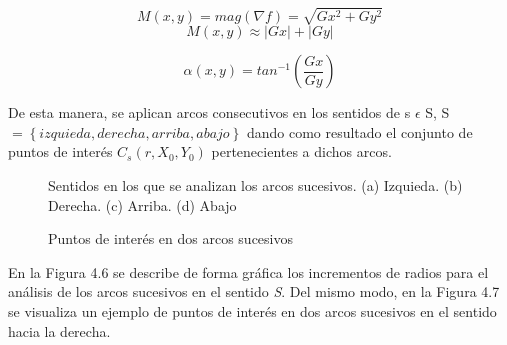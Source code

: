 \[
M(x,y) = mag(\nabla f) = \sqrt{Gx^{2} + Gy^{2}}
\]
\[
M(x,y) \approx \left | Gx \right | + \left | Gy \right |
\]

\[
\alpha(x,y) = tan^{-1} \left ( \frac{Gx}{Gy} \right )
\]

\begin{table}[htbp]
\begin{center}
\end{center}
\end{table}

De esta manera, se aplican arcos consecutivos en los sentidos  de s $\epsilon$ S, S $ = \left \{ \left. izquieda, derecha, arriba, abajo \right \} \right.$ dando como resultado el conjunto de puntos de interés $C_{s}(r, X_{0}, Y_{0})$ pertenecientes a dichos arcos. \\

\begin{figure}[htbp]
\centering
{}
\caption{Sentidos en los que se analizan los arcos sucesivos. (a) Izquieda. (b) Derecha. (c) Arriba. (d) Abajo} \label{fig:señales}
\end{figure}

\begin{figure}[htbp]
\centering
{}
\caption{Puntos de interés en dos arcos sucesivos} \label{fig:señales}
\end{figure}

En la Figura 4.6 se describe de forma gráfica los incrementos de radios para el análisis de los arcos sucesivos en el sentido \textit{S}. Del mismo modo, en la Figura 4.7 se visualiza un ejemplo de puntos de interés en dos arcos sucesivos en el sentido hacia la derecha. \\


